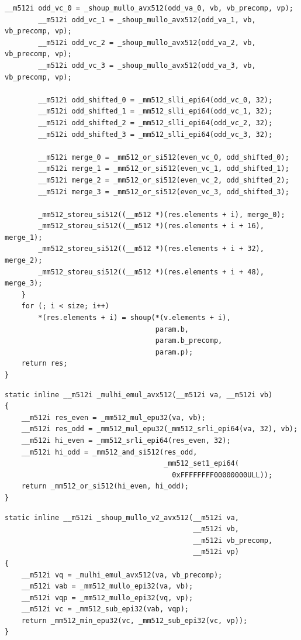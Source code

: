 \documentclass{article}
\begin{document}
\begin{lstlisting}[caption = Implementation of Shoup’s modular reduction (version with multiply-low)]
        __m512i odd_vc_0 = _shoup_mullo_avx512(odd_va_0, vb, vb_precomp, vp);
        __m512i odd_vc_1 = _shoup_mullo_avx512(odd_va_1, vb, vb_precomp, vp);
        __m512i odd_vc_2 = _shoup_mullo_avx512(odd_va_2, vb, vb_precomp, vp);
        __m512i odd_vc_3 = _shoup_mullo_avx512(odd_va_3, vb, vb_precomp, vp);

        __m512i odd_shifted_0 = _mm512_slli_epi64(odd_vc_0, 32);
        __m512i odd_shifted_1 = _mm512_slli_epi64(odd_vc_1, 32);
        __m512i odd_shifted_2 = _mm512_slli_epi64(odd_vc_2, 32);
        __m512i odd_shifted_3 = _mm512_slli_epi64(odd_vc_3, 32);

        __m512i merge_0 = _mm512_or_si512(even_vc_0, odd_shifted_0);
        __m512i merge_1 = _mm512_or_si512(even_vc_1, odd_shifted_1);
        __m512i merge_2 = _mm512_or_si512(even_vc_2, odd_shifted_2);
        __m512i merge_3 = _mm512_or_si512(even_vc_3, odd_shifted_3);

        _mm512_storeu_si512((__m512 *)(res.elements + i), merge_0);
        _mm512_storeu_si512((__m512 *)(res.elements + i + 16), merge_1);
        _mm512_storeu_si512((__m512 *)(res.elements + i + 32), merge_2);
        _mm512_storeu_si512((__m512 *)(res.elements + i + 48), merge_3);
    }
    for (; i < size; i++)
        *(res.elements + i) = shoup(*(v.elements + i),
                                    param.b,
                                    param.b_precomp,
                                    param.p);
    return res;
} 
\end{lstlisting}

\begin{lstlisting}[caption = Auxiliary function \texttt{\_mulhi\_emul\_avx512(...)}]
static inline __m512i _mulhi_emul_avx512(__m512i va, __m512i vb)
{
    __m512i res_even = _mm512_mul_epu32(va, vb);
    __m512i res_odd = _mm512_mul_epu32(_mm512_srli_epi64(va, 32), vb);
    __m512i hi_even = _mm512_srli_epi64(res_even, 32);
    __m512i hi_odd = _mm512_and_si512(res_odd,
                                      _mm512_set1_epi64(
                                        0xFFFFFFFF00000000ULL));
    return _mm512_or_si512(hi_even, hi_odd);
}
\end{lstlisting}

\begin{lstlisting}[caption = Auxiliary function of Shoup’s modular reduction (version 2 of multiply-low)]
static inline __m512i _shoup_mullo_v2_avx512(__m512i va,
                                             __m512i vb,
                                             __m512i vb_precomp,
                                             __m512i vp)
{
    __m512i vq = _mulhi_emul_avx512(va, vb_precomp);
    __m512i vab = _mm512_mullo_epi32(va, vb);
    __m512i vqp = _mm512_mullo_epi32(vq, vp);
    __m512i vc = _mm512_sub_epi32(vab, vqp);
    return _mm512_min_epu32(vc, _mm512_sub_epi32(vc, vp));
}
\end{lstlisting}
\end{document}
